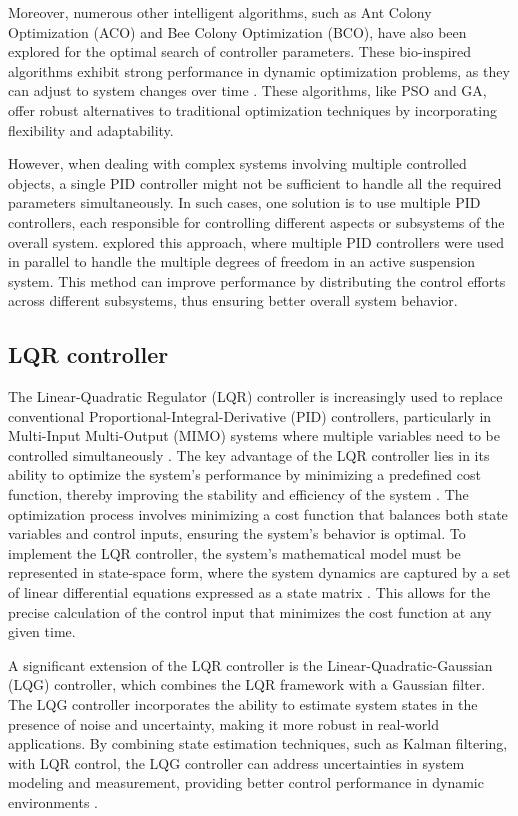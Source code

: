 Moreover, numerous other intelligent algorithms, such as Ant Colony Optimization (ACO) and Bee Colony Optimization (BCO), have also been explored for the optimal search of controller parameters. These bio-inspired algorithms exhibit strong performance in dynamic optimization problems, as they can adjust to system changes over time \cite{dahunsi2020proportional+}. These algorithms, like PSO and GA, offer robust alternatives to traditional optimization techniques by incorporating flexibility and adaptability.

However, when dealing with complex systems involving multiple controlled objects, a single PID controller might not be sufficient to handle all the required parameters simultaneously. In such cases, one solution is to use multiple PID controllers, each responsible for controlling different aspects or subsystems of the overall system. \cite{nguyen2021improving} explored this approach, where multiple PID controllers were used in parallel to handle the multiple degrees of freedom in an active suspension system. This method can improve performance by distributing the control efforts across different subsystems, thus ensuring better overall system behavior.

\subsection{LQR controller}
The Linear-Quadratic Regulator (LQR) controller is increasingly used to replace conventional Proportional-Integral-Derivative (PID) controllers, particularly in Multi-Input Multi-Output (MIMO) systems where multiple variables need to be controlled simultaneously \cite{wu2021multi}. The key advantage of the LQR controller lies in its ability to optimize the system’s performance by minimizing a predefined cost function, thereby improving the stability and efficiency of the system \cite{rodriguez2021active}. The optimization process involves minimizing a cost function that balances both state variables and control inputs, ensuring the system's behavior is optimal. To implement the LQR controller, the system’s mathematical model must be represented in state-space form, where the system dynamics are captured by a set of linear differential equations expressed as a state matrix \cite{nguyen2022application}. This allows for the precise calculation of the control input that minimizes the cost function at any given time.

A significant extension of the LQR controller is the Linear-Quadratic-Gaussian (LQG) controller, which combines the LQR framework with a Gaussian filter. The LQG controller incorporates the ability to estimate system states in the presence of noise and uncertainty, making it more robust in real-world applications. By combining state estimation techniques, such as Kalman filtering, with LQR control, the LQG controller can address uncertainties in system modeling and measurement, providing better control performance in dynamic environments \cite{xia2015linear}.

